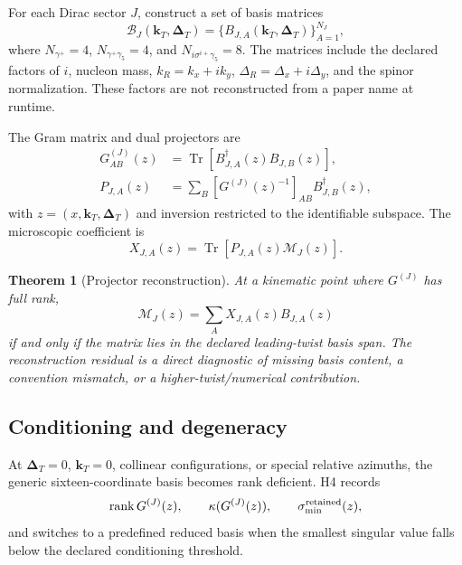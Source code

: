 \documentclass[11pt]{article}
\newtheorem{theorem}[definition]{Theorem}
\newcommand{\kT}{\bm{k}_{T}}
\newcommand{\DT}{\bm{\Delta}_{T}}
\newcommand{\Tr}{\operatorname{Tr}}
\newcommand{\rank}{\operatorname{rank}}
\newcommand{\cM}{\mathcal M}
\newcommand{\cB}{\mathcal B}
\begin{document}
For each Dirac sector \(J\), construct a set of basis matrices
\begin{equation}
 \cB_J(\kT,\DT)
 =\{B_{J,A}(\kT,\DT)\}_{A=1}^{N_J},
 \end{equation}
where \(N_{\gamma^+}=4\), \(N_{\gamma^+\gamma_5}=4\), and
\(N_{i\sigma^{i+}\gamma_5}=8\).  The matrices include the declared factors of
\(i\), nucleon mass, \(k_R=k_x+ik_y\), \(\Delta_R=\Delta_x+i\Delta_y\), and
the spinor normalization.  These factors are not reconstructed from a paper
name at runtime.

The Gram matrix and dual projectors are
\begin{align}
 G_{AB}^{(J)}(z)
 &=\Tr\left[B_{J,A}^\dagger(z)B_{J,B}(z)\right],
 \label{eq:gtmd-gram}\\
 P_{J,A}(z)
 &=\sum_B\left[G^{(J)}(z)^{-1}\right]_{AB}B_{J,B}^\dagger(z),
 \label{eq:gtmd-dual-projector}
\end{align}
with \(z=(x,\kT,\DT)\) and inversion restricted to the identifiable subspace.
The microscopic coefficient is
\begin{equation}
 X_{J,A}(z)
 =\Tr\left[P_{J,A}(z)\cM_J(z)\right].
 \label{eq:gtmd-project}
\end{equation}

\begin{theorem}[Projector reconstruction]
\label{thm:projector-reconstruction}
At a kinematic point where \(G^{(J)}\) has full rank,
\begin{equation}
 \cM_J(z)
 =\sum_A X_{J,A}(z)B_{J,A}(z)
 \label{eq:projector-reconstruct}
\end{equation}
if and only if the matrix lies in the declared leading-twist basis span.
The reconstruction residual is a direct diagnostic of missing basis content,
a convention mismatch, or a higher-twist/numerical contribution.
\end{theorem}

\subsection{Conditioning and degeneracy}

At \(\DT=0\), \(\kT=0\), collinear configurations, or special relative
azimuths, the generic sixteen-coordinate basis becomes rank deficient.  H4
records
\begin{equation}
 \rank G^{(J)}(z),\qquad
 \kappa(G^{(J)}(z)),\qquad
 \sigma_{\min}^{\rm retained}(z),
 \label{eq:gram-diagnostics}
\end{equation}
and switches to a predefined reduced basis when the smallest singular value
falls below the declared conditioning threshold.
\end{document}
